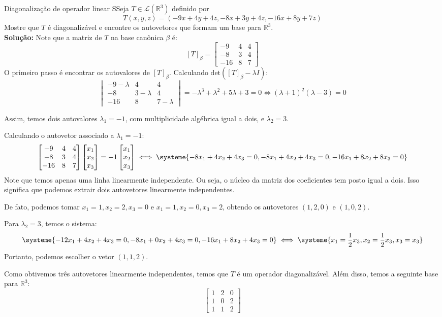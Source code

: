 \documentclass[12pt,a4paper]{article}
\begin{document}
\begin{exemplo}{Diagonalização de operador linear}
SSeja $T \in \mathcal{L}(\mathbb{R}^3)$ definido por \[T(x,y,z) = (-9x+4y+4z, -8x+3y+4z, -16x+8y+7z)\] Mostre que $T$ é diagonalizável e encontre os autovetores que formam um base para $\mathbb{R}^3$. \\

\textbf{Solução:}
Note que a matriz de $T$ na base canônica $\beta$ é:
\[
[T]_{\beta} = 
\begin{bmatrix}
-9 & 4 & 4 \\
-8 & 3 & 4 \\
-16 & 8 & 7
\end{bmatrix}
\]
O primeiro passo é encontrar os autovalores de $[T]_{\beta}$. Calculando $\text{det}([T]_{\beta} - \lambda I)$:
\[
\begin{vmatrix}
-9-\lambda & 4 & 4 \\
-8 & 3-\lambda & 4 \\
-16 & 8 & 7-\lambda
\end{vmatrix}
= -\lambda^3+\lambda^2+5\lambda+3 = 0 \iff (\lambda+1)^2(\lambda-3) = 0
\]

Assim, temos dois autovalores $\lambda_1 = -1$, com multiplicidade algébrica igual a dois, e $\lambda_2 = 3$. 

Calculando o autovetor associado a $\lambda_1 = -1$:
\[
\begin{bmatrix}
-9 & 4 & 4 \\
-8 & 3 & 4 \\
-16 & 8 & 7
\end{bmatrix}
\begin{bmatrix}
x_1 \\
x_2 \\
x_3 \\
\end{bmatrix}
= -1 \begin{bmatrix}
x_1 \\
x_2 \\
x_3 \\
\end{bmatrix}
\iff
\systeme{-8x_1 + 4 x_2 + 4x_3 = 0, -8x_1+4x_2+4x_3 = 0, -16x_1+8x_2+8x_3 = 0}
\]
Note que temos apenas uma linha linearmente independente. Ou seja, o núcleo da matriz dos coeficientes tem posto igual a dois. Isso significa que podemos extrair dois autovetores linearmente independentes.

De fato, podemos tomar $x_1 = 1, x_2 = 2, x_3 = 0$ e $x_1 = 1, x_2 = 0, x_3 = 2$, obtendo os autovetores $(1,2,0)$ e $(1,0,2)$.

Para $\lambda_2 = 3$, temos o sistema:
\[
\systeme{-12x_1 + 4 x_2 + 4x_3 = 0, -8x_1+0x_2+4x_3 = 0, -16x_1+8x_2+4x_3 = 0} \iff \systeme{x_1 = \frac{1}{2} x_3, x_2 = \frac{1}{2} x_3, x_3 = x_3}
\]
Portanto, podemos escolher o vetor $(1,1,2)$.

Como obtivemos três autovetores linearmente independentes, temos que $T$ é um operador diagonalizável. Além disso, temos a seguinte base para $\mathbb{R}^3$:
\[
\begin{bmatrix}
1 & 2 & 0 \\
1 & 0 & 2 \\
1 & 1 & 2
\end{bmatrix}
\]
\end{exemplo}
\end{document}
